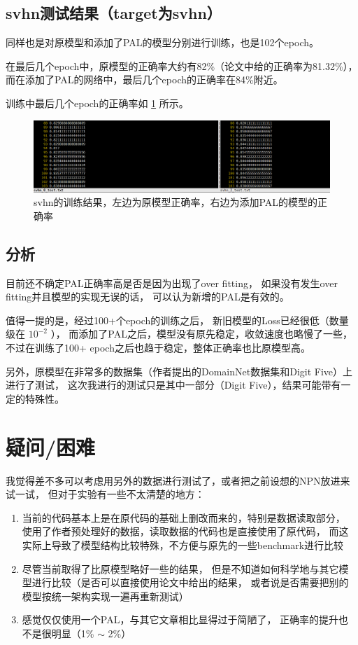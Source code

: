 \documentclass[UTF8]{ctexart}
\begin{document}
        \subsection{svhn测试结果（target为svhn）}
            同样也是对原模型和添加了PAL的模型分别进行训练，也是102个epoch。

            在最后几个epoch中，原模型的正确率大约有82\%（论文中给的正确率为81.32\%），
            而在添加了PAL的网络中，最后几个epoch的正确率在84\%附近。

            训练中最后几个epoch的正确率如 \ref{fig:svhn} 所示。
            \begin{figure}[ht]
                \centering
                \includegraphics[scale=0.36]{Week04_svhn.png}
                \caption{svhn的训练结果，左边为原模型正确率，右边为添加PAL的模型的正确率}
                \label{fig:svhn}
            \end{figure}
        \subsection{分析}
            目前还不确定PAL正确率高是否是因为出现了over fitting，
            如果没有发生over fitting并且模型的实现无误的话，
            可以认为新增的PAL是有效的。

            值得一提的是，经过100+个epoch的训练之后，
            新旧模型的Loss已经很低（数量级在 $10^{-2}$ ），
            而添加了PAL之后，模型没有原先稳定，收敛速度也略慢了一些，
            不过在训练了100+ epoch之后也趋于稳定，整体正确率也比原模型高。

            另外，原模型在非常多的数据集（作者提出的DomainNet数据集和Digit Five）上进行了测试，
            这次我进行的测试只是其中一部分（Digit Five），结果可能带有一定的特殊性。
    \section{疑问/困难}
        我觉得差不多可以考虑用另外的数据进行测试了，或者把之前设想的NPN放进来试一试，
        但对于实验有一些不太清楚的地方：
        \begin{enumerate}
            \item 当前的代码基本上是在原代码的基础上删改而来的，特别是数据读取部分，
                使用了作者预处理好的数据，读取数据的代码也是直接使用了原代码，
                而这实际上导致了模型结构比较特殊，不方便与原先的一些benchmark进行比较
            \item 尽管当前取得了比原模型略好一些的结果，
                但是不知道如何科学地与其它模型进行比较（是否可以直接使用论文中给出的结果，
                或者说是否需要把别的模型按统一架构实现一遍再重新测试）
            \item 感觉仅仅使用一个PAL，与其它文章相比显得过于简陋了，
                正确率的提升也不是很明显（1\% $\sim$ 2\%）
        \end{enumerate}
\end{document}
